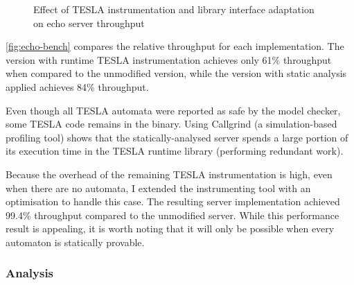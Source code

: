 \begin{figure}
  \centering
  \caption{Effect of TESLA instrumentation and library interface adaptation on
  echo server throughput}
  \label{fig:echo-bench}
\end{figure}

\autoref{fig:echo-bench} compares the relative throughput for each
implementation. The version with runtime TESLA instrumentation achieves only 61\%
throughput when compared to the unmodified version, while the version with
static analysis applied achieves 84\% throughput.

Even though all TESLA automata were reported as safe by the model checker, some
TESLA code remains in the binary. Using Callgrind \cite{weidendorfer_tool_2004}
(a simulation-based profiling tool) shows that the statically-analysed server
spends a large portion of its execution time in the TESLA runtime library
(performing redundant work).

Because the overhead of the remaining TESLA instrumentation is high, even when
there are no automata, I extended the instrumenting tool with an optimisation to
handle this case. The resulting server implementation achieved 99.4\% throughput
compared to the unmodified server. While this performance result is appealing,
it is worth noting that it will only be possible when every automaton is
statically provable.

\subsubsection{Analysis}

